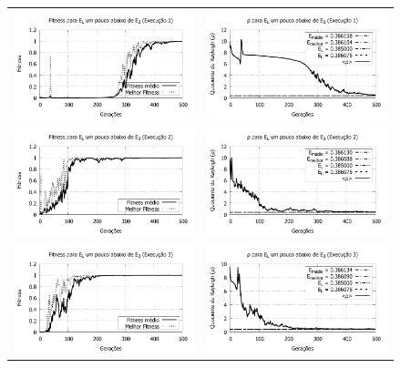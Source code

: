 \begin{figure}[p]
	\centering
  \begin{tabular}{@{}cc@{}}
			
		\includegraphics[width=.40\textwidth]{figs/resultados/variandoEL/T2E1_fitness.pdf} &
    \includegraphics[width=.40\textwidth]{figs/resultados/variandoEL/T2E1_rho.pdf}   \\

		\includegraphics[width=.40\textwidth]{figs/resultados/variandoEL/T2E2_fitness.pdf} &
    \includegraphics[width=.40\textwidth]{figs/resultados/variandoEL/T2E2_rho.pdf}   \\
		
		\includegraphics[width=.40\textwidth]{figs/resultados/variandoEL/T2E3_fitness.pdf} &
    \includegraphics[width=.40\textwidth]{figs/resultados/variandoEL/T2E3_rho.pdf}   \\
		

\end{tabular}
\end{figure}
